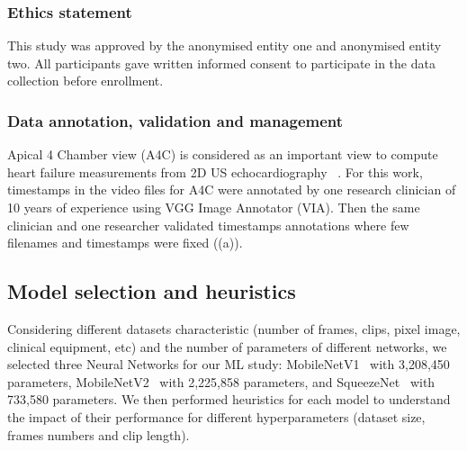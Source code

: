 \documentclass[mlabstract,twocolumn]{jmlr}
\begin{document}
\subsubsection{Ethics statement}
This study was approved by the anonymised entity one and anonymised entity two.
All participants gave written informed consent to participate in the data collection before enrollment.

\subsubsection{Data annotation, validation and management}
Apical 4 Chamber view (A4C) is considered as an important view to compute heart failure measurements from 2D US echocardiography ~\citep{2017_hall_JIntensiveCareSociety}.
For this work, timestamps in the video files for A4C were annotated by one research clinician of 10 years of experience using VGG Image Annotator (VIA).
Then the same clinician  and one researcher validated timestamps annotations where few filenames and timestamps were fixed ((a)).

\subsection{Model selection and heuristics}
Considering different datasets characteristic (number of frames, clips, pixel image, clinical equipment, etc) and the number of parameters of different networks,
we selected three Neural Networks for our ML study:
MobileNetV1~\citep{2017-howared_CoRR_MobileNetV1} with 3,208,450 parameters, MobileNetV2~\citep{Sandler_2018_CVPR_MobileNetV2} with 2,225,858 parameters, and SqueezeNet~\citep{iandola2017squeezenet} with 733,580 parameters.
We then performed heuristics for each model to understand the impact of their performance for different hyperparameters (dataset size, frames numbers and clip length). %
\end{document}
